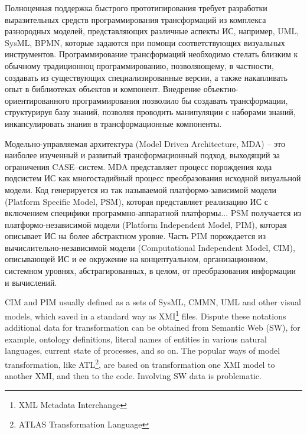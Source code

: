 \documentclass[conference]{IEEEtran} \IEEEoverridecommandlockouts
\begin{document}
Полноценная поддержка быстрого прототипирования требует разработки выразительных средств программирования трансформаций из комплекса разнородных моделей, представляющих различные аспекты ИС, например, UML, SysML, BPMN, которые задаются при помощи соответствующих визуальных инструментов.  Программирование трансформаций необходимо стелать близким к обычному традиционноц программированию, позволяющему, в частности, создавать из существующих специализированные версии, а также накапливать опыт в библиотеках объектов и компонент. Внедрение объектно-ориентированного программирования позволило бы создавать трансформации, структурируя базу знаний, позволяя проводить манипуляции с наборами знаний, инкапсулировать знания в трансформационные компоненты. 

Модельно-управляемая архитектура (Model Driven Architecture, MDA) -- это наиболее изученный и развитый трансформационный подход, выходящий за ограничения CASE--систем. MDA представляет процесс порождения кода подсистем ИС как многостадийный процесс преобразования исходной визуальной модели. Код генерируется из так называемой платформо-зависимой модели (Platform Specific Model, PSM), которая представляет реализацию ИС с включением специфики программно-аппаратной платформы... PSM получается из платформо-независимой модели (Platform Independent Model, PIM), которая описывает ИС на более абстрактном уровне. Часть PIM порождается из вычислительно-независимой модели (Computational Independent Model, CIM), описывающей ИС и ее окружение на концептуальном, организационном, системном уровнях, абстрагированных, в целом, от преобразования информации и вычислений. 

CIM and PIM usually defined as a sets of SysML, CMMN, UML and other visual models, which saved in a standard way as XMI\footnote{XML Metadata Interchange} files. Dispute these notations additional data for transformation can be obtained from Semantic Web (SW), for example, ontology definitions, literal names of entities in various natural languages, current state of processes, and so on. The popular ways of model transformation, like ATL\footnote{ATLAS Transformation Language}, are based on transformation one XMI model to another XMI, and then to the code. Involving SW data is problematic. 
\end{document}
